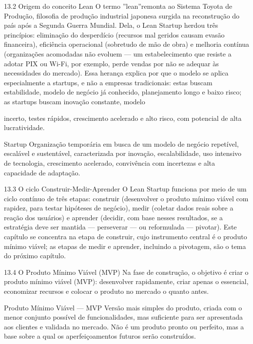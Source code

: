 13.2 Origem do conceito Lean O termo ”lean”remonta ao Sistema Toyota de Produção, filosofia de produção industrial japonesa surgida na reconstrução do país após a Segunda Guerra Mundial. Dela, o Lean Startup herdou três princípios: eliminação do desperdício (recursos mal geridos causam evasão financeira), eficiência operacional (sobretudo de mão de obra) e melhoria contínua (organizações acomodadas não evoluem — um estabelecimento que resiste a adotar PIX ou Wi-Fi, por exemplo, perde vendas por não se adequar às necessidades do mercado). Essa herança explica por que o modelo se aplica especialmente a startups, e não a empresas tradicionais: estas buscam estabilidade, modelo de negócio já conhecido, planejamento longo e baixo risco; as startups buscam inovação constante, modelo

incerto, testes rápidos, crescimento acelerado e alto risco, com potencial de alta lucratividade.

Startup Organização temporária em busca de um modelo de negócio repetível, escalável e sustentável, caracterizada por inovação, escalabilidade, uso intensivo de tecnologia, crescimento acelerado, convivência com incertezas e alta capacidade de adaptação.

13.3 O ciclo Construir-Medir-Aprender O Lean Startup funciona por meio de um ciclo contínuo de três etapas: construir (desenvolver o produto mínimo viável com rapidez, para testar hipóteses de negócio), medir (coletar dados reais sobre a reação dos usuários) e aprender (decidir, com base nesses resultados, se a estratégia deve ser mantida — perseverar — ou reformulada — pivotar). Este capítulo se concentra na etapa de construir, cujo instrumento central é o produto mínimo viável; as etapas de medir e aprender, incluindo a pivotagem, são o tema do próximo capítulo.

13.4 O Produto Mínimo Viável (MVP) Na fase de construção, o objetivo é criar o produto mínimo viável (MVP): desenvolver rapidamente, criar apenas o essencial, economizar recursos e colocar o produto no mercado o quanto antes.

Produto Mínimo Viável — MVP Versão mais simples do produto, criada com o menor conjunto possível de funcionalidades, mas suficiente para ser apresentada aos clientes e validada no mercado. Não é um produto pronto ou perfeito, mas a base sobre a qual os aperfeiçoamentos futuros serão construídos.


